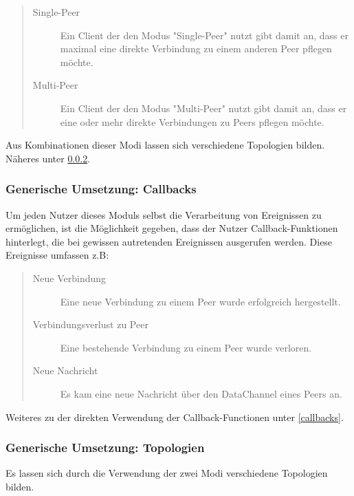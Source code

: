 \begin{quote}
  \begin{description}
  \item[Single-Peer]
  Ein Client der den Modus "Single-Peer" nutzt gibt damit an, dass er maximal eine direkte Verbindung zu einem anderen Peer pflegen möchte.

  \item[Multi-Peer]
  Ein Client der den Modus "Multi-Peer" nutzt gibt damit an, dass er eine oder mehr direkte Verbindungen zu Peers pflegen möchte.
  \end{description}
\end{quote}

Aus Kombinationen dieser Modi lassen sich verschiedene Topologien bilden. Näheres unter \ref{generictopology}.



\subsubsection{Generische Umsetzung: Callbacks}
Um jeden Nutzer dieses Moduls selbst die Verarbeitung von Ereignissen zu ermöglichen, ist die Möglichkeit gegeben, dass der Nutzer Callback-Funktionen hinterlegt, die bei gewissen autretenden Ereignissen ausgerufen werden.
Diese Ereignisse umfassen z.B:

\begin{quote}
  \begin{description}
  \item[Neue Verbindung]
  Eine neue Verbindung zu einem Peer wurde erfolgreich hergestellt.

  \item[Verbindungsverlust zu Peer]
  Eine bestehende Verbindung zu einem Peer wurde verloren.

  \item[Neue Nachricht]
  Es kam eine neue Nachricht über den DataChannel eines Peers an.
  \end{description}
\end{quote}

Weiteres zu der direkten Verwendung der Callback-Functionen unter \ref{callbacks}.



\subsubsection{Generische Umsetzung: Topologien} \label{generictopology}
Es lassen sich durch die Verwendung der zwei Modi verschiedene Topologien bilden.


